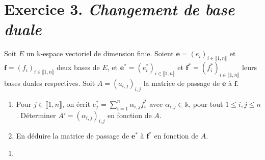 \documentclass[./main]{subfiles}
\begin{document}
  \section{Exercice 3. \textit{Changement de base duale}}
  \begin{enonce}
    Soit $E$ un $\mathds{k}$-espace vectoriel de dimension finie.
    Soient $\mathbf{e} = (e_i)_{i \in \llbracket 1,n\rrbracket}$ et $\mathbf{f} = (f_i)_{i\in \llbracket 1,n\rrbracket}$ deux bases de $E$, et $\mathbf{e}^* = (e_i^*)_{i \in \llbracket 1,n\rrbracket}$ et $\mathbf{f}^* = (f^*_i)_{i \in \llbracket 1,n\rrbracket}$ leurs bases duales respectives.
    Soit $A = (a_{i,j})_{i,j}$ la matrice de passage de $\mathbf{e}$ à $\mathbf{f}$.
    \begin{enumerate}
      \item Pour $j \in \llbracket 1,n\rrbracket$, on écrit $e^*_j = \sum_{i = 1}^n \alpha_{i,j}f^*_i$ avec $\alpha_{i,j} \in \mathds{k}$, pour tout $1 \le i,j \le n$.
        Déterminer $A' = (\alpha_{i,j})_{i,j}$ en fonction de $A$. 
      \item En déduire la matrice de passage de $\mathbf{e}^*$ à $\mathbf{f}^*$ en fonction de $A$.
    \end{enumerate}
  \end{enonce}

  \begin{enumerate}
    \item 
  \end{enumerate}
\end{document}
